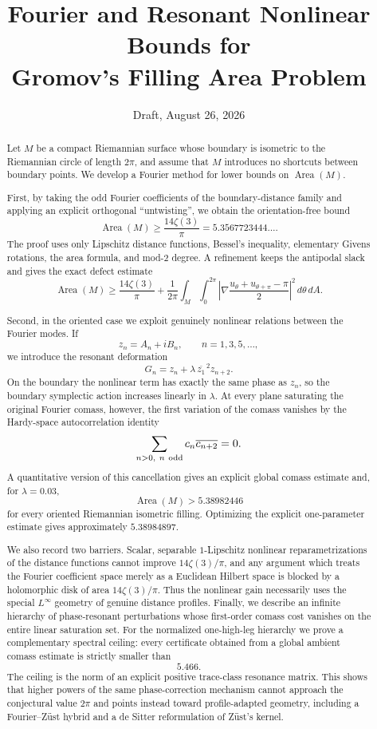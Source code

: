 \documentclass[11pt]{article}
\title{\bfseries Fourier and Resonant Nonlinear Bounds for\\
Gromov's Filling Area Problem}
\author{}
\date{Draft, August 26, 2026}
\newcommand{\Area}{\operatorname{Area}}
\begin{document}
\maketitle

\begin{abstract}
Let $M$ be a compact Riemannian surface whose boundary is isometric to the
Riemannian circle of length $2\pi$, and assume that $M$ introduces no
shortcuts between boundary points.  We develop a Fourier method for lower
bounds on $\Area(M)$.

First, by taking the odd Fourier coefficients of the boundary-distance
family and applying an explicit orthogonal ``untwisting'', we obtain the
orientation-free bound
\[
        \boxed{\Area(M)\ge \frac{14\zeta(3)}{\pi}}
        =5.3567723444\ldots .
\]
The proof uses only Lipschitz distance functions, Bessel's inequality,
elementary Givens rotations, the area formula, and mod-$2$ degree.
A refinement keeps the antipodal slack and gives the exact defect estimate
\[
 \Area(M)\ge\frac{14\zeta(3)}{\pi}
 +\frac1{2\pi}\int_M\int_0^{2\pi}
 \left|\nabla\frac{
 u_\theta+u_{\theta+\pi}-\pi}{2}\right|^2
 \,d\theta\,dA .
\]

Second, in the oriented case we exploit genuinely nonlinear relations
between the Fourier modes.  If
\[
 z_n=A_n+iB_n,\qquad n=1,3,5,\ldots,
\]
we introduce the resonant deformation
\[
        G_n=z_n+\lambda\,\overline{z_1}^{\,2}z_{n+2}.
\]
On the boundary the nonlinear term has exactly the same phase as $z_n$, so
the boundary symplectic action increases linearly in $\lambda$.  At every
plane saturating the original Fourier comass, however, the first variation
of the comass vanishes by the Hardy-space autocorrelation identity
\[
        \sum_{n>0,\ n\ {\rm odd}}c_n\overline{c_{n+2}}=0.
\]
A quantitative version of this cancellation gives an explicit global
comass estimate and, for $\lambda=0.03$,
\[
        \boxed{\Area(M)>5.38982446}
\]
for every oriented Riemannian isometric filling.  Optimizing the explicit
one-parameter estimate gives approximately $5.38984897$.

We also record two barriers.  Scalar, separable $1$-Lipschitz nonlinear
reparametrizations of the distance functions cannot improve
$14\zeta(3)/\pi$, and any argument which treats the Fourier coefficient
space merely as a Euclidean Hilbert space is blocked by a holomorphic disk
of area $14\zeta(3)/\pi$.  Thus the nonlinear gain necessarily uses the
special $L^\infty$ geometry of genuine distance profiles.  Finally, we
describe an infinite hierarchy of phase-resonant perturbations whose
first-order comass cost vanishes on the entire linear saturation set.  For
the normalized one-high-leg hierarchy we prove a complementary spectral
ceiling: every certificate obtained from a global ambient comass estimate is
strictly smaller than
\[
        5.466.
\]
The ceiling is the norm of an explicit positive trace-class resonance matrix.
This shows that higher powers of the same phase-correction mechanism cannot
approach the conjectural value $2\pi$ and points instead toward profile-adapted
geometry, including a Fourier--Z\"ust hybrid and a de Sitter reformulation of
Z\"ust's kernel.


\end{abstract}
\end{document}
